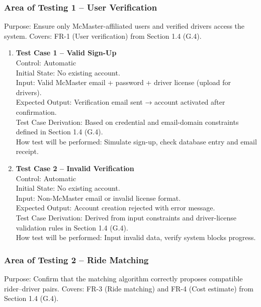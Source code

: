\documentclass[12pt, titlepage]{article}
\begin{document}
\subsubsection{Area of Testing 1 – User Verification}

Purpose: Ensure only McMaster-affiliated users and verified drivers access the system.  
Covers: FR-1 (User verification) from Section 1.4 (G.4).

\begin{enumerate}
\item \textbf{Test Case 1 – Valid Sign-Up}\\
Control: Automatic\\
Initial State: No existing account.\\
Input: Valid McMaster email + password + driver license (upload for drivers).\\
Expected Output: Verification email sent → account activated after confirmation.\\
Test Case Derivation: Based on credential and email-domain constraints defined in Section 1.4 (G.4).\\
How test will be performed: Simulate sign-up, check database entry and email receipt.\\[5pt]

\item \textbf{Test Case 2 – Invalid Verification}\\
Control: Automatic\\
Initial State: No existing account.\\
Input: Non-McMaster email or invalid license format.\\
Expected Output: Account creation rejected with error message.\\
Test Case Derivation: Derived from input constraints and driver-license validation rules in Section 1.4 (G.4).\\
How test will be performed: Input invalid data, verify system blocks progress.\\
\end{enumerate}

\subsubsection{Area of Testing 2 – Ride Matching}

Purpose: Confirm that the matching algorithm correctly proposes compatible rider–driver pairs.  
Covers: FR-3 (Ride matching) and FR-4 (Cost estimate) from Section 1.4 (G.4).
\end{document}
